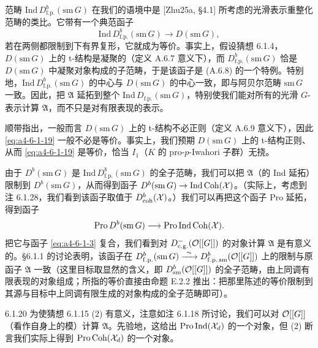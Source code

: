 范畴 $\mathrm{Ind}\,D^b_{\mathrm{f.p.}}(\mathrm{sm}\,G)$ 在我们的语境中是 [Zhu25a, §4.1] 所考虑的光滑表示重整化范畴的类比。它带有一个典范函子
\begin{equation}\tag{6.1.19}\label{eq:a4-6-1-19}
\mathrm{Ind}\,D^b_{\mathrm{f.p.}}(\mathrm{sm}\,G)\longrightarrow D(\mathrm{sm}\,G),
\end{equation}
若在两侧都限制到下有界复形，它就成为等价。事实上，假设猜想 6.1.4，$D(\mathrm{sm}\,G)$ 上的 t-结构是凝聚的（定义 A.6.7 意义下），而 $D^b_{\mathrm{f.p.}}(\mathrm{sm}\,G)$ 恰是 $D(\mathrm{sm}\,G)$ 中凝聚对象构成的子范畴，于是该函子是 (A.6.8) 的一个特例。特别地，$\mathrm{Ind}\,D^b_{\mathrm{f.p.}}(\mathrm{sm}\,G)$ 的中心与 $D(\mathrm{sm}\,G)$ 的中心一致，即与阿贝尔范畴 $\mathrm{sm}\,G$ 一致。因此，把 $\mathfrak{A}$ 延拓到整个 $\mathrm{Ind}\,D_{\mathrm{f.p.}}(\mathrm{sm}\,G)$，特别使我们能对所有的光滑 $G$-表示计算 $\mathfrak{A}$，而不只是对有限表现的表示。

顺带指出，一般而言 $D(\mathrm{sm}\,G)$ 上的 t-结构不必正则（定义 A.6.9 意义下），因此 \eqref{eq:a4-6-1-19} 一般不必是等价。事实上，我们预期 $D(\mathrm{sm}\,G)$ 上的 t-结构正则、从而 \eqref{eq:a4-6-1-19} 是等价，恰当 $I_1$（$K$ 的 pro-$p$-Iwahori 子群）无挠。

由于 $D^b(\mathrm{sm}\,G)$ 是 $\mathrm{Ind}\,D^b_{\mathrm{f.p.}}(\mathrm{sm}\,G)$ 的全子范畴，我们可以把 $\mathfrak{A}$（的 Ind 延拓）限制到 $D^b(\mathrm{sm}\,G)$，从而得到函子 $D^b(\mathrm{sm}\,G)\to\mathrm{Ind}\,\mathrm{Coh}(\mathcal{X})$。（实际上，考虑到注 6.1.28，我们看到该函子取值于 $D^b_{\mathrm{coh}}(\mathcal{X})$。）我们可以再把这个函子 Pro 延拓，得到函子
\[
\mathrm{Pro}\,D^b(\mathrm{sm}\,G)\longrightarrow\mathrm{Pro}\,\mathrm{Ind}\,\mathrm{Coh}(\mathcal{X}).
\]
把它与函子 \eqref{eq:a4-6-1-3} 复合，我们看到对 $D^-_{\mathrm{c.g.}}(\mathcal{O}[[G]])$ 的对象计算 $\mathfrak{A}$ 是有意义的。§6.1.1 的讨论表明，该函子在 $D^b_{\mathrm{f.p.}}(\mathrm{sm}\,G)\xrightarrow{\ \sim\ } D^b_{\mathrm{f.p.}\,\mathrm{sm}}(\mathcal{O}[[G]])$ 上的限制与原函子 $\mathfrak{A}$ 一致（这里目标取显然的含义，即 $D^b_{\mathrm{sm}}(\mathcal{O}[[G]])$ 的全子范畴，由上同调有限表现的对象组成；所指的等价直接由命题 E.2.2 推出：把那里陈述的等价限制到其源与目标中上同调有限生成的对象构成的全子范畴即可）。

\begin{rem}{6.1.20}\label{thm:a4-6-1-20}
为使猜想 6.1.15 (2) 有意义，注意如注 6.1.18 所讨论，我们可以对 $\mathcal{O}[[G]]$（看作自身上的模）计算 $\mathfrak{A}$。先验地，这给出 $\mathrm{Pro}\,\mathrm{Ind}(\mathcal{X}_d)$ 的一个对象，但 (2) 断言我们实际上得到 $\mathrm{Pro}\,\mathrm{Coh}(\mathcal{X}_d)$ 的一个对象。
\end{rem}


